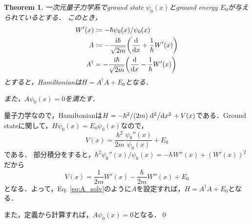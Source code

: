 \documentclass[english, dvipdfmx, a4paper]{jsarticle}
\theoremstyle{break}
\newtheorem{thm}{Theorem}
\renewcommand{\i}{\mathrm{i}}
\begin{document}
	\begin{thm}\label{thm:construct_by_groundstate}
		一次元量子力学系でground state $\psi_0(x)$とground energy $E_0$が与えられているとする．
		このとき，
		\begin{align}
			W'(x) &\coloneqq -\hbar \psi_0(x)/\psi_0(x)\label{eq:Wp_solv}\\
			A & \coloneqq -\frac{\i\hbar}{\sqrt{2m}}\qty(\dv{}{x} + \frac{1}{\hbar}W'(x))\label{eq:A_solv}\\
			A^{\dag} &= -\frac{\i\hbar}{\sqrt{2m}}\qty(\dv{}{x} - \frac{1}{\hbar}W'(x))
		\end{align}
		とすると，Hamiltonianは$H = A^{\dag}A + E_0$となる．

		また，$A\psi_0(x) = 0$を満たす．
	\end{thm}

	量子力学なので，Hamiltonianは$H = -\hbar^2/(2m)\dv*[2]{}{x} + V(x)$である．Ground stateに関して，$H\psi_0(x) = E_0\psi_0(x)$なので，
	\begin{equation}
		V(x) = \frac{\hbar^2}{2m}\frac{\psi_0''(x)}{\psi_0(x)} + E_0
	\end{equation}
	である．
	部分積分をすると，$\hbar^2\psi_0''(x)/\psi_0(x) = -\hbar W''(x) +(W'(x))^2$だから
	\begin{equation}
		V(x) = \frac{1}{2m}W'(x) - \frac{\hbar}{2m}W''(x) + E_0\label{eq:SUSY_potential}
	\end{equation}
	となる．よって，Eq. \eqref{eq:A_solv}のように$A$を設定すれば，$H = A^{\dag}A + E_0$となる．

	また，定義から計算すれば，$A\psi_0(x) = 0$となる．\qed
\end{document}
